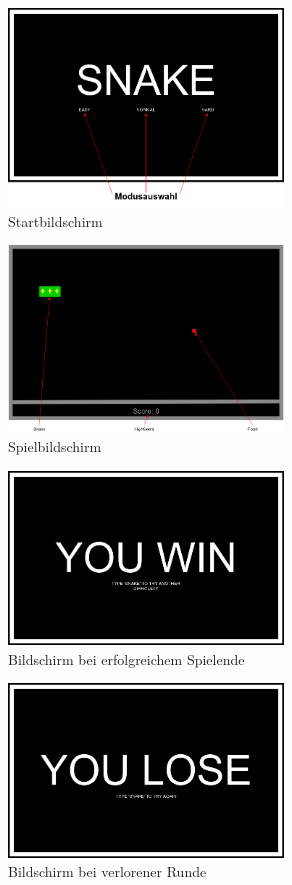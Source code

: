 \documentclass[a4paper,10pt]{article}
\begin{document}
		\begin{figure}[h]
			\centering
			\includegraphics[width=0.65\textwidth]{GUI_start}
			\caption{Startbildschirm}
			\label{GUI-Start}
		\end{figure}
		\begin{figure}[h]
			\centering
			\includegraphics[width=0.65\textwidth]{GUI_SKizze-gameplay}
			\caption{Spielbildschirm}
			\label{GUI-Gameplay}
		\end{figure}
		\newpage
		\begin{figure}[h]
			\centering
			\includegraphics[width=0.65\textwidth]{GUI_SKizze-win}
			\caption{Bildschirm bei erfolgreichem Spielende}
			\label{GUI-Win}
		\end{figure}
		\begin{figure}[h]
			\centering
			\includegraphics[width=0.65\textwidth]{GUI_SKizze-lose}
			\caption{Bildschirm bei verlorener Runde}
			\label{GUI-Lose}
		\end{figure}
		\newpage
\end{document}
